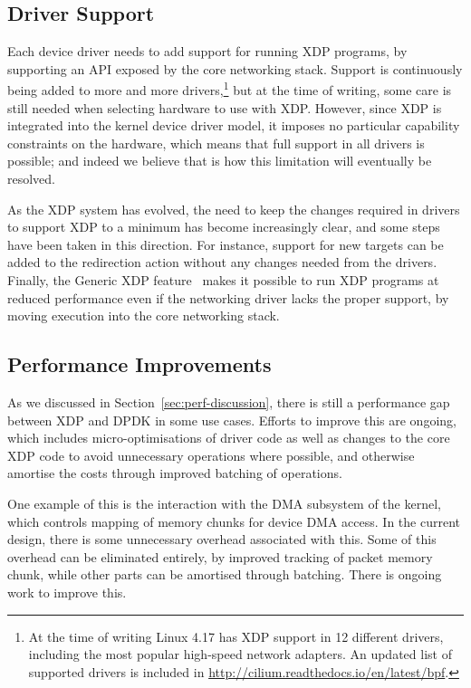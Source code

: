 \documentclass[10pt,sigconf,anonymous]{acmart}
\begin{document}
\subsection{Driver Support}
\label{sec:driver-support}
Each device driver needs to add support for running XDP programs, by supporting
an API exposed by the core networking stack. Support is continuously being added
to more and more drivers,\footnote{At the time of writing Linux 4.17 has XDP
  support in 12 different drivers, including the most popular high-speed network
  adapters. An updated list of supported drivers is included in
  \url{http://cilium.readthedocs.io/en/latest/bpf}.} but at the time of writing,
some care is still needed when selecting hardware to use with XDP. However,
since XDP is integrated into the kernel device driver model, it imposes no
particular capability constraints on the hardware, which means that full support
in all drivers is possible; and indeed we believe that is how this limitation
will eventually be resolved.

As the XDP system has evolved, the need to keep the changes required in drivers
to support XDP to a minimum has become increasingly clear, and some steps have
been taken in this direction. For instance, support for new targets can be added
to the redirection action without any changes needed from the drivers. Finally,
the Generic XDP feature~\cite{generic-xdp} makes it possible to run XDP
programs at reduced performance even if the networking driver lacks the proper
support, by moving execution into the core networking stack.

\subsection{Performance Improvements}
\label{sec:perf-improvements}
As we discussed in Section~\ref{sec:perf-discussion}, there is still a
performance gap between XDP and DPDK in some use cases. Efforts to improve this
are ongoing, which includes micro-optimisations of driver code as well as
changes to the core XDP code to avoid unnecessary operations where possible, and
otherwise amortise the costs through improved batching of operations.

One example of this is the interaction with the DMA subsystem of the kernel,
which controls mapping of memory chunks for device DMA access. In the current
design, there is some unnecessary overhead associated with this. Some of this
overhead can be eliminated entirely, by improved tracking of packet memory
chunk, while other parts can be amortised through batching. There is ongoing
work to improve this.
\end{document}
